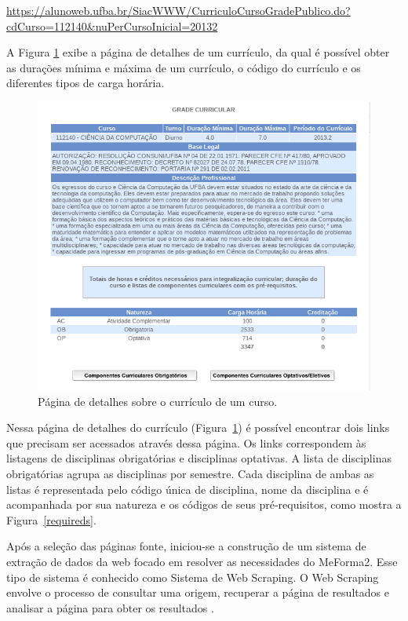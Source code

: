 \url{https://alunoweb.ufba.br/SiacWWW/CurriculoCursoGradePublico.do?cdCurso=112140&nuPerCursoInicial=20132}

A Figura \ref{ementa} exibe a página de detalhes de um currículo, da qual é possível obter as durações mínima e máxima de um currículo, o código do currículo e os diferentes tipos de carga horária. 

\begin{figure}[H]
    \centering
    \includegraphics[scale=0.75]{pics/c4/1-ementa.png}
    \caption{Página de detalhes sobre o currículo de um curso.}
    \label{ementa}
\end{figure}

Nessa página de detalhes do currículo (Figura~\ref{ementa}) é possível encontrar dois links que precisam ser acessados através dessa página. Os links correspondem às listagens de disciplinas obrigatórias e disciplinas optativas. A lista de disciplinas obrigatórias agrupa as disciplinas por semestre. Cada disciplina de ambas as listas é representada pelo código única de disciplina, nome da disciplina e é acompanhada por sua natureza e os códigos de seus pré-requisitos, como mostra a Figura~\ref{requireds}.

Após a seleção das páginas fonte, iniciou-se a construção de um sistema de extração de dados da web focado em resolver as necessidades do MeForma2. Esse tipo de sistema é conhecido como Sistema de Web Scraping. O Web Scraping envolve o processo de consultar uma origem, recuperar a página de resultados e analisar a página para obter os resultados \cite{salerno2006method}.

